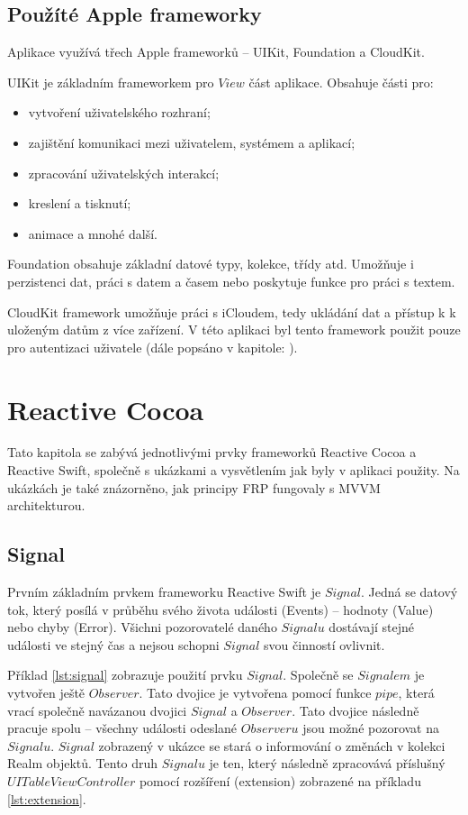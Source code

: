 \documentclass[thesis=M,czech]{FITthesis}[2012/06/26]
\begin{document}
\subsection{Použíté Apple frameworky}
Aplikace využívá třech Apple frameworků -- UIKit, Foundation a CloudKit.

UIKit je základním frameworkem pro $View$ část aplikace. Obsahuje části pro:
\begin{itemize}
\item vytvoření uživatelského rozhraní;
\item zajištění komunikaci mezi uživatelem, systémem a aplikací;
\item zpracování uživatelských interakcí;
\item kreslení a tisknutí;
\item animace a mnohé další. \cite{UIKit}
\end{itemize} 

Foundation obsahuje základní datové typy, kolekce, třídy atd. Umožňuje i perzistenci dat, práci s datem a časem nebo poskytuje funkce pro práci s textem. \cite{foundation}

CloudKit framework umožňuje práci s iCloudem, tedy ukládání dat a přístup k k uloženým datům z více zařízení. V této aplikaci byl tento framework použit pouze pro autentizaci uživatele (dále popsáno v kapitole: ).

\section{Reactive Cocoa}
Tato kapitola se zabývá jednotlivými prvky frameworků Reactive Cocoa a Reactive Swift, společně s ukázkami a vysvětlením jak byly v aplikaci použity. Na ukázkách je také znázorněno, jak principy FRP fungovaly s MVVM architekturou.

\subsection{Signal}
Prvním základním prvkem frameworku Reactive Swift je $Signal$. Jedná se datový tok, který posílá v průběhu svého života události (Events) -- hodnoty (Value) nebo chyby (Error). Všichni pozorovatelé daného $Signalu$ dostávají stejné události ve stejný čas a nejsou schopni $Signal$ svou činností ovlivnit. \cite{signal}

Příklad \ref{lst:signal} zobrazuje použití prvku $Signal$. Společně se $Signalem$ je vytvořen ještě $Observer$. Tato dvojice je vytvořena pomocí funkce $pipe$, která vrací společně navázanou dvojici $Signal$ a $Observer$. Tato dvojice následně pracuje spolu -- všechny události odeslané $Observeru$ jsou možné pozorovat na $Signalu$. $Signal$ zobrazený v ukázce se stará o informování o změnách v kolekci Realm objektů. Tento druh $Signalu$ je ten, který následně zpracovává příslušný $UITableViewController$ pomocí rozšíření (extension) zobrazené na příkladu \ref{lst:extension}.
\end{document}
